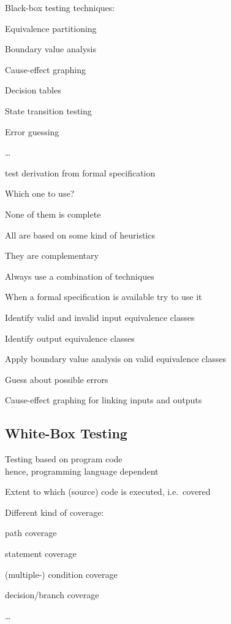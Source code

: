 \begin{itemize*}
	\item Black-box testing techniques:
	\begin{itemize*}
		\item Equivalence partitioning
		\item Boundary value analysis
		\item Cause-effect graphing
		\item Decision tables
		\item State transition testing
		\item Error guessing
        \item \ldots
		\begin{itemize*}
			\item test derivation from formal specification
		\end{itemize*}		
	\end{itemize*}
	\item Which one to use?
	\begin{itemize*}
		\item None of them is complete
		\item All are based on some kind of heuristics
		\item They are complementary
	\end{itemize*}
	\item Always use a combination of techniques
	\begin{itemize*}
		\item When a formal specification is available try to use it
		\item Identify valid and invalid input equivalence classes
		\item Identify output equivalence classes
		\item Apply boundary value analysis on valid equivalence classes
		\item Guess about possible errors
		\item Cause-effect graphing for linking inputs and outputs
	\end{itemize*}
\end{itemize*}

\subsection{White-Box Testing}

\begin{itemize*}
	\item Testing based on program code\\
	hence, programming language dependent
	\item Extent to which (source) code is executed, i.e.\ covered
	\item Different kind of coverage:
	\begin{itemize*}
		\item path coverage
		\item statement coverage
		\item (multiple-) condition coverage
		\item decision/branch coverage
		\item \ldots
	\end{itemize*}
\end{itemize*}

